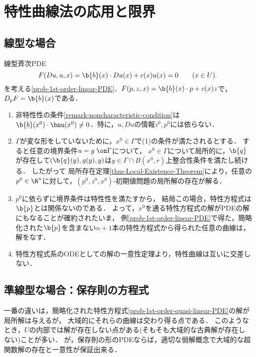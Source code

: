 \documentclass[uplatex,dvipdfmx]{jsreport}
\begin{document}
\section{特性曲線法の応用と限界}

\subsection{線型な場合}

\begin{problem}\label{prob-1st-order-linear-PDE-revisited}
    線型斉次PDE
    \[F(Du,u,x)=\b{b}(x)\cdot Du(x)+c(x)u(x)=0\qquad(x\in U).\]
    を考える\ref{prob-1st-order-linear-PDE}．$F(p,z,x)=\b{b}(x)\cdot p+c(x)z$で，$D_pF=\b{b}(x)$である．
    \begin{enumerate}
        \item 非特性性の条件\ref{remark-noncharacteristic-condition}は$\b{b}(x^0)\cdot\bnu(x^0)\ne0$．特に，$u,Du$の情報$z^0,p^0$には依らない．
        \item $\Gamma$が変な形をしていないために，$x^0\in\Gamma$で(1)の条件が満たされるとする．
        すると任意の境界条件$u=g\;\on\Gamma$について，
        $x^0\in\Gamma$について局所的に，$\b{q}$が存在して$(\b{q}(y),g(y),y)$は$y\in\Gamma\cap B(x^0,r)$上整合性条件を満たし続ける．
        したがって
        局所存在定理\ref{thm-Local-Existence-Theorem}により，任意の$p^0\in\R^n$に対して，$(p^0,z^0,x^0)$-初期値問題の局所解の存在が解る．
        \item $p^0$に依らずに境界条件は特性性を満たすから，
        結局この場合，特性方程式は$\b{p}$とは関係ないのである．
        よって，$x^0$を通る特性方程式の解がPDEの解にもなることが確約されたいま，
        例\ref{prob-1st-order-linear-PDE}で得た，簡略化された$\b{p}$を含まない$n+1$本の特性方程式から得られた任意の曲線は，解をなす．
        \item 特性方程式系のODEとしての解の一意性定理より，特性曲線は互いに交差しない．
    \end{enumerate}
\end{problem}

\subsection{準線型な場合：保存則の方程式}

\begin{tcolorbox}[colframe=ForestGreen, colback=ForestGreen!10!white,breakable,colbacktitle=ForestGreen!40!white,coltitle=black,fonttitle=\bfseries\sffamily,
title=]
    一番の違いは，簡略化された特性方程式\ref{prob-1st-order-quasi-linear-PDE}の解が局所解は与えるが，
    大域的にそれらの曲線は交わり得る点である．
    このようなとき，$U$の内部では解が存在しない点がある(そもそも大域的な古典解が存在しない)ことが多い．
    が，保存則の形のPDEならば，適切な弱解概念で大域的な超関数解の存在と一意性が保証出来る．
\end{tcolorbox}
\end{document}
